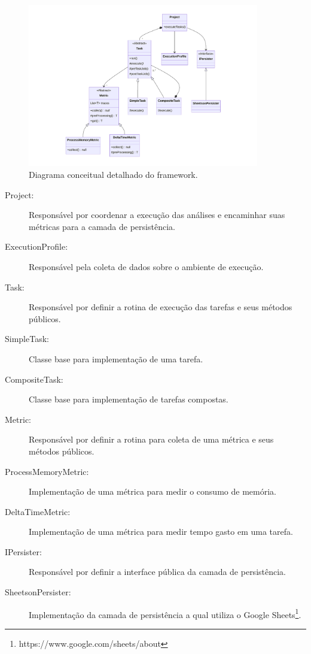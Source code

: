\documentclass[12pt]{tcc}
\begin{document}
	\begin{figure}[!ht]
		\centering
		\includegraphics[width=0.9\textwidth]{figures/diagrama-classes.pdf}
		\caption{Diagrama conceitual detalhado do framework.}
		\label{fig:diag-classes}
	\end{figure}


	\begin{description}
		\item[Project:] Responsável por coordenar a execução das análises e encaminhar suas métricas para a camada de persistência.
		\item[ExecutionProfile:] Responsável pela coleta de dados sobre o ambiente de execução.
		\item[Task:] Responsável por definir a rotina de execução das tarefas e seus métodos públicos.
		\item[SimpleTask:] Classe base para implementação de uma tarefa.
		\item[CompositeTask:] Classe base para implementação de tarefas compostas.
		\item[Metric:] Responsável por definir a rotina para coleta de uma métrica e seus métodos públicos.
		\item[ProcessMemoryMetric:] Implementação de uma métrica para medir o consumo de memória.
		\item[DeltaTimeMetric:] Implementação de uma métrica para medir tempo gasto em uma tarefa.
		\item[IPersister:] Responsável por definir a interface pública da camada de persistência.
		\item[SheetsonPersister:] Implementação da camada de persistência a qual utiliza o Google Sheets\footnote{https://www.google.com/sheets/about}.
	\end{description}
\end{document}
